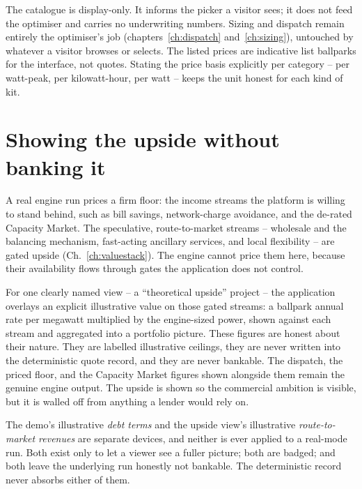 The catalogue is display-only. It informs the picker a visitor sees; it does not feed the optimiser and carries no underwriting numbers. Sizing and dispatch remain entirely the optimiser's job (chapters~\ref{ch:dispatch} and~\ref{ch:sizing}), untouched by whatever a visitor browses or selects. The listed prices are indicative list ballparks for the interface, not quotes. Stating the price basis explicitly per category -- per watt-peak, per kilowatt-hour, per watt -- keeps the unit honest for each kind of kit.

\section{Showing the upside without banking it}

A real engine run prices a firm floor: the income streams the platform is willing to stand behind, such as bill savings, network-charge avoidance, and the de-rated Capacity Market. The speculative, route-to-market streams -- wholesale and the balancing mechanism, fast-acting ancillary services, and local flexibility -- are gated upside (Ch.~\ref{ch:valuestack}). The engine cannot price them here, because their availability flows through gates the application does not control.

For one clearly named view -- a ``theoretical upside'' project -- the application overlays an explicit illustrative value on those gated streams: a ballpark annual rate per megawatt multiplied by the engine-sized power, shown against each stream and aggregated into a portfolio picture. These figures are honest about their nature. They are labelled illustrative ceilings, they are never written into the deterministic quote record, and they are never bankable. The dispatch, the priced floor, and the Capacity Market figures shown alongside them remain the genuine engine output. The upside is shown so the commercial ambition is visible, but it is walled off from anything a lender would rely on.

\begin{caution}
The demo's illustrative \emph{debt terms} and the upside view's illustrative \emph{route-to-market revenues} are separate devices, and neither is ever applied to a real-mode run. Both exist only to let a viewer see a fuller picture; both are badged; and both leave the underlying run honestly not bankable. The deterministic record never absorbs either of them.
\end{caution}

